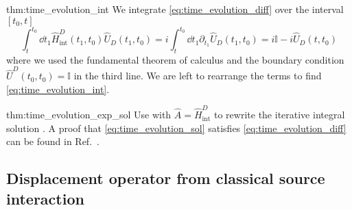 \begin{delayedproof}{thm:time_evolution_int}
	We integrate \cref{eq:time_evolution_diff} over the interval $[t_0,t]$
	\begin{equation*}
		\int_t^{t_0}\dd{t_1}
		\hat{H}_\text{int}^D(t_1,t_0)
		\hat{U}_D(t_1,t_0)
		=
		i\int_t^{t_0}\dd{t_1}
		\partial_{t_1}
		\hat{U}_D(t_1,t_0)
		=
		i\mathbb{I}
		-
		i\hat{U}_D(t,t_0)
	\end{equation*}
	where we used the fundamental theorem of calculus and the boundary condition $\hat{U}^D(t_0,t_0)=\mathbb{I}$ in the third line.
	We are left to rearrange the terms to find \cref{eq:time_evolution_int}.
\end{delayedproof}
\begin{delayedproof}{thm:time_evolution_exp_sol}
	Use  with $\hat{A}=\hat{H}_\text{int}^D$ to rewrite the iterative integral solution .
	A proof that \cref{eq:time_evolution_sol} satisfies \cref{eq:time_evolution_diff} can be found in Ref.~\cite[p.~219]{Greiner2013}.
\end{delayedproof}

\subsection{Displacement operator from classical source interaction}

